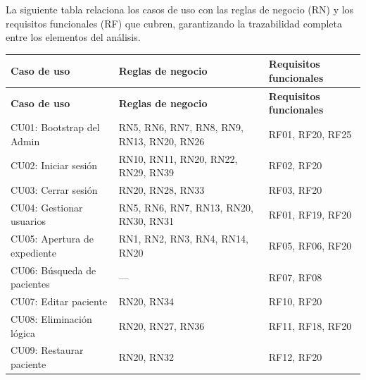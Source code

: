 \documentclass[11pt,a4paper]{article}
\begin{document}
La siguiente tabla relaciona los casos de uso con las reglas de negocio (RN) y los requisitos funcionales (RF) que cubren, garantizando la trazabilidad completa entre los elementos del análisis.

\begin{longtable}{|L{4cm}|L{4.5cm}|L{4.5cm}|}
    \hline
    \textbf{Caso de uso}         & \textbf{Reglas de negocio}                & \textbf{Requisitos funcionales} \\
    \hline
    \endfirsthead

    \hline
    \textbf{Caso de uso}         & \textbf{Reglas de negocio}                & \textbf{Requisitos funcionales} \\
    \hline
    \endhead

    CU01: Bootstrap del Admin    & RN5, RN6, RN7, RN8, RN9, RN13, RN20, RN26 & RF01, RF20, RF25                \\
    \hline

    CU02: Iniciar sesión         & RN10, RN11, RN20, RN22, RN29, RN39        & RF02, RF20                      \\
    \hline

    CU03: Cerrar sesión          & RN20, RN28, RN33                          & RF03, RF20                      \\
    \hline

    CU04: Gestionar usuarios     & RN5, RN6, RN7, RN13, RN20, RN30, RN31     & RF01, RF19, RF20                \\
    \hline

    CU05: Apertura de expediente & RN1, RN2, RN3, RN4, RN14, RN20            & RF05, RF06, RF20                \\
    \hline

    CU06: Búsqueda de pacientes  & ---                                       & RF07, RF08                      \\
    \hline

    CU07: Editar paciente        & RN20, RN34                                & RF10, RF20                      \\
    \hline

    CU08: Eliminación lógica     & RN20, RN27, RN36                          & RF11, RF18, RF20                \\
    \hline

    CU09: Restaurar paciente     & RN20, RN32                                & RF12, RF20                      \\
    \hline


\end{longtable}
\end{document}
